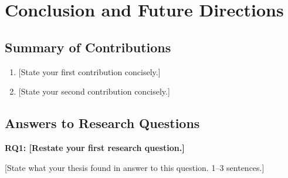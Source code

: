%
%
%

\chapter{Conclusion and Future Directions}
\label{chapter_conclusion}



\section{Summary of Contributions}


\begin{enumerate}
    \item{} [State your first contribution concisely.]

    \item{} [State your second contribution concisely.]

\end{enumerate}


\section{Answers to Research Questions}

\noindent
\textbf{RQ1: [Restate your first research question.]}
\newline

[State what your thesis found in answer to this question.
1--3 sentences.]
\newline

